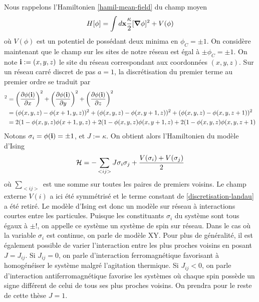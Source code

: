 Nous rappelons l'Hamiltonien \ref{hamil-mean-field} du champ moyen 
\begin{align}
    H[\phi] = \int d {\bf x}  \frac{\kappa}{2}[{\boldsymbol \nabla} \phi]^2 + V(\phi)
\end{align}
où $V(\phi)$ est un potentiel de possédant deux minima en $\phi_C = \pm1$. On considère maintenant que le champ sur les sites de notre réseau est égal à $\pm \phi_C = \pm 1$. On note ${\bf i}:=(x,y,z)$ le site du réseau correspondant aux coordonnées $(x,y,z)$. Sur un réseau carré discret de pas $a=1$, la discrétisation du premier terme au premier ordre se traduit par 
\begin{align}
    [{\boldsymbol \nabla} \phi({\bf i})]^2 &= \left( \frac{\partial \phi({\bf i})}{\partial x} \right)^2  + \left( \frac{\partial \phi({\bf i})}{\partial y} \right)^2 + \left( \frac{\partial \phi({\bf i})}{\partial z} \right)^2\nn
    &= (\phi(x,y,z)-\phi(x+1,y,z))^2 + (\phi(x,y,z)-\phi(x,y+1,z))^2 + (\phi(x,y,z)-\phi(x,y,z+1))^2 \nn
    &= 2 (1-\phi(x,y,z)\phi(x+1,y,z) + 2 (1-\phi(x,y,z)\phi(x,y+1,z) +2 (1-\phi(x,y,z)\phi(x,y,z+1) 
    \label{discretisation-landau}
\end{align}
Notons $\sigma_i = \phi({\bf i}) = \pm 1$, et $J := \kappa$. On obtient alors l'Hamiltonien du modèle d'Ising
\begin{equation}
	\mathcal{H} =  - \sum_{<i j >} J \sigma_i \sigma_j + \frac{V(\sigma_i)+V(\sigma_j)}{2}
	\label{hamil-ising}
\end{equation}
où $\sum_{< ij >}$ est une somme sur toutes les paires de premiers voisins. Le champ externe $V(i)$ a ici été symmétrisé et le terme constant de \ref{discretisation-landau} a été retiré.
Le modèle d'Ising\cite{niss_history_2005,niss_history_2009} est donc un modèle sur réseau à interactions courtes entre les particules. Puisque les constituants $\sigma_i$ du système sont tous égaux à $\pm!$, on appelle ce système un système de spin sur réseau. Dans le cas où la variable $\sigma_i$ est continue, on parle de modèle XY. Pour plus de généralité, il est également possible de varier l'interaction entre les plus proches voisins en posant $J = J_{ij}$. Si $ J_{ij} =0$, on parle d'interaction ferromagnétique favorisant à homogénéiser le système malgré l'agitation thermique. Si  $J_{ij} < 0$, on parle d'interaction antiferromagnétique favorise les systèmes où chaque spin possède un signe différent de celui de tous ses plus proches voisins. On prendra pour le reste de cette thèse $J=1$.

